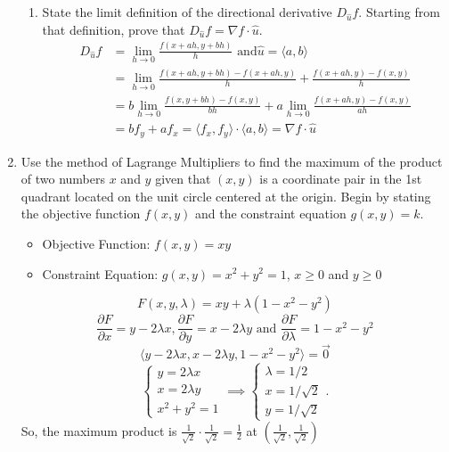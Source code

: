 \begin{enumerate}
\begin{enumerate}[label=\alph*.]
		\item State the limit definition of the directional derivative $D_{\hat{u}}f$. Starting from that definition, prove that $D_{\hat{u}}f = \nabla f\cdot\hat{u}$.\\
		\begin{align*}
			D_{\hat{u}}f &= \lim_{h \to 0}{\frac{f(x+ah, y+bh)}{h}} \text{ and} \hat{u}=\langle a, b \rangle \\
			&= \lim_{h \to 0}{\frac{f(x+ah, y+bh) - f(x+ah, y)}{h} + \frac{f(x+ah, y) - f(x,y)}{h}} \\
			&= b\lim_{h \to 0}{\frac{f(x, y+bh) - f(x,y)}{bh}} + a\lim_{h \to 0}{\frac{f(x+ah, y) - f(x,y)}{ah}} \\
			&= bf_y + af_x = \langle f_x, f_y \rangle \cdot \langle a, b \rangle = \nabla f \cdot \hat{u}
		\end{align*}
	\end{enumerate}
	
	\item Use the method of Lagrange Multipliers to find the maximum of the product of two numbers $x$ and $y$ given that $(x,y)$ is a coordinate pair in the 1st quadrant located on the unit circle centered at the origin. Begin by stating the objective function $f(x,y)$ and the constraint equation $g(x,y) = k$.\\
	\begin{itemize}
		\item Objective Function: $f(x,y) = xy$
		\item Constraint Equation: $g(x,y) = x^2 + y^2 = 1$, $x \geq 0$ and $y \geq 0$
	\end{itemize}
	\begin{equation*}
		F(x,y,\lambda) = xy + \lambda(1-x^2-y^2)
	\end{equation*}
	\begin{equation*}
		\frac{\partial F}{\partial x} = y-2\lambda x, \frac{\partial F}{\partial y} = x-2\lambda y \text{ and } \frac{\partial F}{\partial\lambda} = 1-x^2-y^2
	\end{equation*}
	\begin{equation*}
		\langle y-2\lambda x, x-2 \lambda y, 1-x^2-y^2 \rangle = \vec{0}
	\end{equation*}
	\begin{equation*}
		\begin{cases}
			y = 2\lambda x \\
			x = 2\lambda y \\
			x^2 + y^2 = 1
		\end{cases} \implies \begin{cases}
			\lambda = 1/2 \\
			x = 1/\sqrt{2} \\
			y = 1/\sqrt{2}
		\end{cases}.
	\end{equation*}
	So, the maximum product is $\frac{1}{\sqrt{2}} \cdot \frac{1}{\sqrt{2}} = \frac{1}{2}$ at $\left(\frac{1}{\sqrt{2}}, \frac{1}{\sqrt{2}}\right)$\\
	

\end{enumerate}
